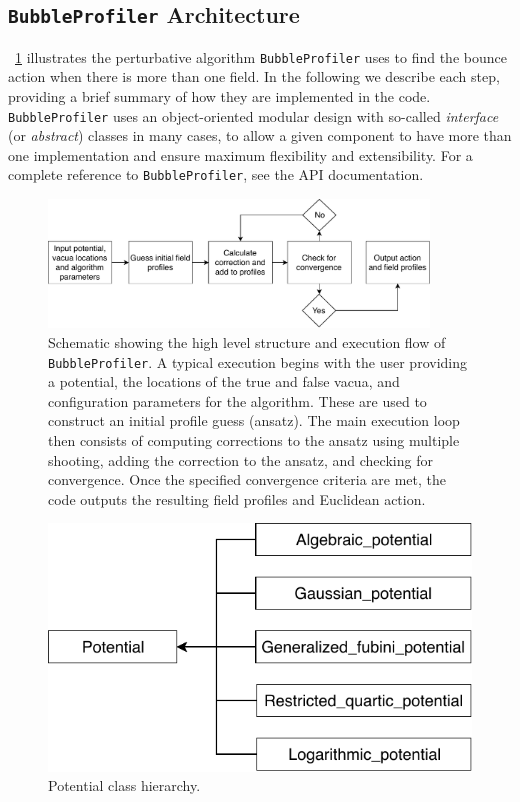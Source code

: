 \documentclass[final,3p,11pt,pdflatex]{elsarticle}
\makeatletter
\newcommand{\bp}{\texttt{BubbleProfiler}\@\xspace}
\newcommand{\figref}[1]{\figurename~\ref{#1}}
\makeatother
\begin{document}
\subsection{\bp Architecture}  

\figref{fig:code_structure} illustrates the perturbative algorithm \bp
uses to find the bounce action when there is more than one field.  In the
following we describe each step, providing a brief summary of how they
are implemented in the code.  \bp uses an object-oriented modular
design with so-called {\it interface} (or {\it abstract}) classes in
many cases, to allow a given component to have more than one
implementation and ensure maximum flexibility and extensibility.  For
a complete reference to \bp, see the API documentation.


\begin{figure}[h]
\centering
\includegraphics[width=0.9\textwidth]{figures/code_structure_v2}
\caption{Schematic showing the high level structure and execution flow of \bp. A typical execution begins with the user providing a potential, the locations of the true and false vacua, and configuration parameters for the algorithm. These are used to construct an initial profile guess (ansatz). The main execution loop then consists of computing corrections to the ansatz using multiple shooting, adding the correction to the ansatz, and checking for convergence. Once the specified convergence criteria are met, the code outputs the resulting field profiles and Euclidean action. }
\label{fig:code_structure}
\end{figure}

\begin{figure}[h]
\centering
\includegraphics[scale=0.7]{figures/classes_potential}
\caption{Potential class hierarchy.}
\label{fig:classes_potential}
\end{figure}
\end{document}
